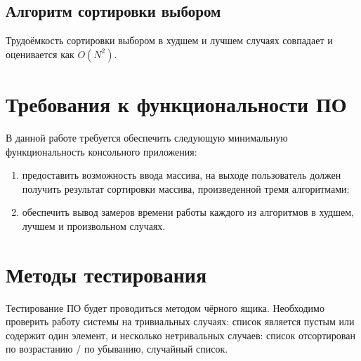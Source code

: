         \subsection{Алгоритм сортировки выбором}
            Трудоёмкость сортировки выбором в худшем и лучшем случаях совпадает
            и оценивается как $ O(N^2) $.       


    \section{Требования к функциональности ПО}
        В данной работе требуется обеспечить следующую минимальную функциональность консольного приложения:
        \begin{enumerate}
            \item предоставить возможность ввода массива, на выходе пользователь должен получить результат сортировки массива, произведенной тремя алгоритмами;
            \item обеспечить вывод замеров времени работы каждого из алгоритмов в худшем, лучшем и произвольном случаях.
        \end{enumerate}

    \section{Методы тестирования}
    Тестирование ПО будет проводиться методом чёрного ящика. Необходимо проверить работу системы 
    на тривиальных случаях: список является пустым или содержит один элемент,
    и несколько нетривальных случаев: список отсортирован по возрастанию / по убыванию, случайный список.

\newpage